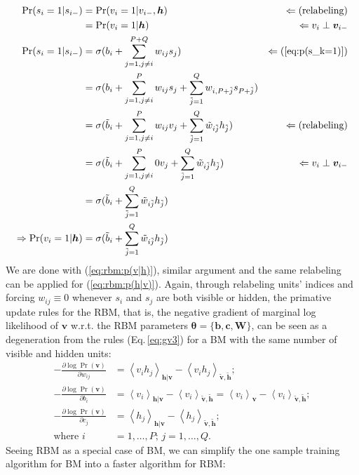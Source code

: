 \documentclass[11pt]{article}
\newcommand{\mean}[2]{\left\langle{#1}\right\rangle_{#2}}
\newcommand{\vb}{\boldsymbol{b}}
\newcommand{\vc}{\boldsymbol{c}}
\newcommand{\vh}{\boldsymbol{h}}
\newcommand{\vv}{\boldsymbol{v}}
\newcommand{\mw}{\boldsymbol{W}}
\newcommand{\vht}{\tilde{\vh}}
\newcommand{\vvt}{\tilde{\vv}}
\newcommand{\pEC}{\boldsymbol{\theta}}
\newcommand{\PDV}[2]{\frac{\partial #1}{\partial #2}}
\begin{document}
{\begin{align*}
  \Pr(s_i=1|s_{i-}) & = \Pr(v_i=1|v_{i-}, \vh)                                  & \Leftarrow (\textrm{relabeling}) \\
                    & = \Pr(v_i=1|\vh)                                          & \Leftarrow v_i \perp \vv_{i-}    \\
  \Pr(s_i=1|s_{i-}) & = \sigma(b_i + \sum_{j=1, j \ne i}^{P+Q}{w_{ij}s_j} )     & \Leftarrow (\ref{eq:p(s_k=1)})   \\
                    & = \sigma(b_i + \sum_{j=1, j \ne i}^P{w_{ij}s_j}
                      + \sum_{\jt=1}^{Q}{w_{i,P+\jt}s_{P+\jt}}) \\
                    & = \sigma(\bt_i + \sum_{j=1, j \ne i}^P{w_{ij}v_j}
                      + \sum_{\jt=1}^{Q}{\wt_{i\jt}h_{\jt}})                    & \Leftarrow (\textrm{relabeling}) \\
                    & = \sigma(\bt_i + \sum_{j=1, j \ne i}^P{0 v_j}
                      + \sum_{\jt=1}^{Q}{\wt_{i\jt}h_{\jt}})                    & \Leftarrow v_i \perp \vv_{i-} \\
                    & = \sigma(\bt_i + \sum_{\jt=1}^Q{\wt_{i\jt}h_{\jt}}) \\
  \Rightarrow \Pr(v_i=1|\vh) & = \sigma(\bt_i + \sum_{\jt=1}^Q{\wt_{i\jt}h_{\jt}})
\end{align*}
We are done with (\ref{eq:rbm:p(v|h)}), similar argument and the same relabeling can be applied for (\ref{eq:rbm:p(h|v)}). Again, through relabeling units' indices and forcing $w_{ij} \equiv 0$ whenever $s_i$ and $s_j$ are both visible or hidden, the primative update rules for the RBM, that is, the negative gradient of marginal log likelihood of $\vv$ w.r.t. the RBM parameters $\pEC=\{\vb, \vc, \mw\}$, can be seen as a degeneration from the rules (Eq.\,\ref{eq:gv3}) for a BM with the same number of visible and hidden units:
\begin{align*}
  -\PDV{\log{\Pr(\vv)}}{w_{ij}} & = \mean{v_i h_j}{\vh|\vv} - \mean{v_i h_j}{\vvt, \vht}; \\
  -\PDV{\log{\Pr(\vv)}}{b_i} & = \mean{v_i}{\vh|\vv} - \mean{v_i}{\vvt, \vht} = \mean{v_i}{\vv} - \mean{v_i}{\vvt, \vht}; \\
  -\PDV{\log{\Pr(\vv)}}{c_j} & = \mean{h_j}{\vh|\vv} - \mean{h_j}{\vvt, \vht}; \\
  \textrm{where } i & = 1, \dots, P;\, j = 1, \dots, Q.
\end{align*}
Seeing RBM as a special case of BM, we can simplify the one sample training algorithm for BM into a faster algorithm for RBM:
}
\end{document}
